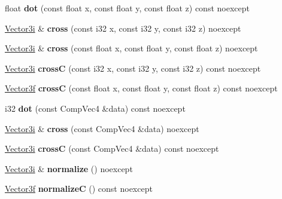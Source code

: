 \begin{DoxyCompactItemize}
float {\bfseries dot} (const float x, const float y, const float z) const noexcept
\item 
\mbox{\label{class_vector3i_ac490e1628961036896d39e21a84386a4}} 
\mbox{\hyperlink{class_vector3i}{Vector3i}} \& {\bfseries cross} (const i32 x, const i32 y, const i32 z) noexcept
\item 
\mbox{\label{class_vector3i_ae33d6d4e65c8904d4525fcfac97aa1a3}} 
\mbox{\hyperlink{class_vector3i}{Vector3i}} \& {\bfseries cross} (const float x, const float y, const float z) noexcept
\item 
\mbox{\label{class_vector3i_a0b13848b328238c70c48b1a2c5fbf10a}} 
\mbox{\hyperlink{class_vector3i}{Vector3i}} {\bfseries crossC} (const i32 x, const i32 y, const i32 z) const noexcept
\item 
\mbox{\label{class_vector3i_afbdef08e97bd024bac1f6e8b344a146a}} 
\mbox{\hyperlink{class_vector3f}{Vector3f}} {\bfseries crossC} (const float x, const float y, const float z) const noexcept
\item 
\mbox{\label{class_vector3i_a9ccfe2696fb6206c2a6239fea1ba33f5}} 
i32 {\bfseries dot} (const Comp\+Vec4 \&data) const noexcept
\item 
\mbox{\label{class_vector3i_ac0e7c634c71f46297d4c3f765830c1bc}} 
\mbox{\hyperlink{class_vector3i}{Vector3i}} \& {\bfseries cross} (const Comp\+Vec4 \&data) noexcept
\item 
\mbox{\label{class_vector3i_a9b191effcb23d67e7fcde2d1ef0ba304}} 
\mbox{\hyperlink{class_vector3i}{Vector3i}} {\bfseries crossC} (const Comp\+Vec4 \&data) const noexcept
\item 
\mbox{\label{class_vector3i_aa295f9eada994d9200414e08a8070fb6}} 
\mbox{\hyperlink{class_vector3i}{Vector3i}} \& {\bfseries normalize} () noexcept
\item 
\mbox{\label{class_vector3i_acb1c2d3747bf0e84596e48156f73f32e}} 
\mbox{\hyperlink{class_vector3f}{Vector3f}} {\bfseries normalizeC} () const noexcept
\item 

\end{DoxyCompactItemize}
